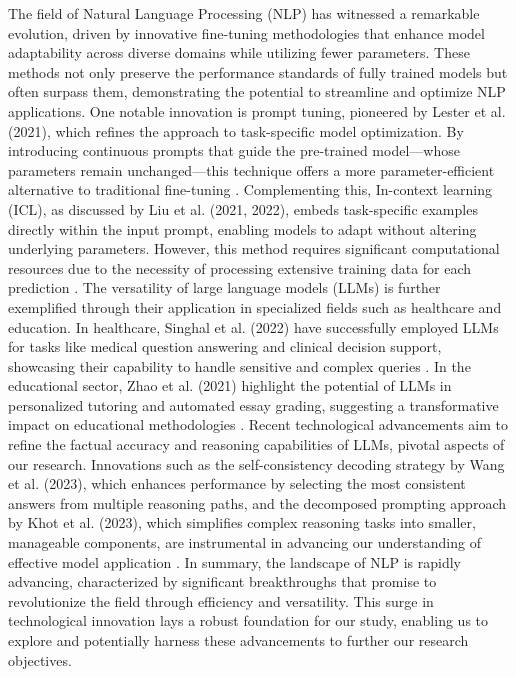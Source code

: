 \documentclass[logo,msc]{infthesis}           %
\begin{document}
The field of Natural Language Processing (NLP) has witnessed a remarkable evolution, driven by innovative fine-tuning methodologies that enhance model adaptability across diverse domains while utilizing fewer parameters. These methods not only preserve the performance standards of fully trained models but often surpass them, demonstrating the potential to streamline and optimize NLP applications. One notable innovation is prompt tuning, pioneered by Lester et al. (2021), which refines the approach to task-specific model optimization. By introducing continuous prompts that guide the pre-trained model—whose parameters remain unchanged—this technique offers a more parameter-efficient alternative to traditional fine-tuning \cite{lester2021powerscaleparameterefficientprompt}. Complementing this, In-context learning (ICL), as discussed by Liu et al. (2021, 2022), embeds task-specific examples directly within the input prompt, enabling models to adapt without altering underlying parameters. However, this method requires significant computational resources due to the necessity of processing extensive training data for each prediction \cite{liu2021pretrainpromptpredictsystematic, liu2022few}. The versatility of large language models (LLMs) is further exemplified through their application in specialized fields such as healthcare and education. In healthcare, Singhal et al. (2022) have successfully employed LLMs for tasks like medical question answering and clinical decision support, showcasing their capability to handle sensitive and complex queries \cite{singhal2022largelanguagemodelsencode}. In the educational sector, Zhao et al. (2021) highlight the potential of LLMs in personalized tutoring and automated essay grading, suggesting a transformative impact on educational methodologies \cite{zhao2021calibrate}. Recent technological advancements aim to refine the factual accuracy and reasoning capabilities of LLMs, pivotal aspects of our research. Innovations such as the self-consistency decoding strategy by Wang et al. (2023), which enhances performance by selecting the most consistent answers from multiple reasoning paths, and the decomposed prompting approach by Khot et al. (2023), which simplifies complex reasoning tasks into smaller, manageable components, are instrumental in advancing our understanding of effective model application \cite{wang2023selfconsistencyimproveschainthought, khot2023decomposedpromptingmodularapproach}. In summary, the landscape of NLP is rapidly advancing, characterized by significant breakthroughs that promise to revolutionize the field through efficiency and versatility. This surge in technological innovation lays a robust foundation for our study, enabling us to explore and potentially harness these advancements to further our research objectives.
\end{document}
